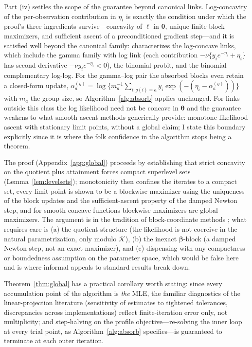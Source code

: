 \documentclass[11pt]{article}
\newcommand{\bbeta}{\bm{\beta}}
\newcommand{\btheta}{\bm{\theta}}
\begin{document}
Part (iv) settles the scope of the guarantee beyond canonical links.
Log-concavity of the per-observation contribution in $\eta_i$ is exactly
the condition under which the proof's three ingredients
survive---concavity of $\ell$ in $\btheta$, unique finite block
maximizers, and sufficient ascent of a preconditioned gradient
step---and it is satisfied well beyond the canonical family:
\citet{pratt1981} characterizes the log-concave links, which include
the gamma family with log link (each contribution
$-\nu\{y_i e^{-\eta_i} + \eta_i\}$ has second derivative
$-\nu y_i e^{-\eta_i} < 0$), the binomial probit, and the binomial
complementary log-log.  For the gamma--log pair the absorbed blocks even
retain a closed-form update,
$\alpha^{(g)}_a = \log\{ m_a^{-1} \sum_{i : g(i)=a} y_i
\exp(-(\eta_i - \alpha^{(g)}_a))\}$ with $m_a$ the group size, so
Algorithm~\ref{alg:absorb} applies unchanged.  For links outside this
class the log likelihood need not be concave in $\btheta$ and the
guarantee weakens to what smooth ascent methods generically provide:
monotone likelihood ascent with stationary limit points, without a
global claim; I state this boundary explicitly since it is where the
folk confidence in the algorithm stops being a theorem.

The proof (Appendix~\ref{app:global}) proceeds by establishing that
strict concavity on the quotient plus attainment forces compact
superlevel sets (Lemma~\ref{lem:levelsets}); monotonicity then confines
the iterates to a compact set, every limit point is shown to be a
blockwise maximizer using the uniqueness of the block updates and the
sufficient-ascent property of the damped Newton step, and for smooth
concave functions blockwise maximizers are global maximizers.  The
argument is in the tradition of block-coordinate methods
\citep{bertsekas1999,tseng2001}; what requires care is (a) the quotient
structure (the likelihood is not coercive in the natural parametrization,
only modulo $\mathcal{K}$), (b) the inexact $\bbeta$-block (a damped
Newton step, not an exact maximizer), and (c) dispensing with any
compactness or boundedness assumption on the parameter space, which would
be false here and is where informal appeals to standard results break
down.

Theorem~\ref{thm:global} has a practical corollary worth stating: since
every accumulation point of the algorithm is \emph{the} MLE, the familiar
diagnostics of the linear-projection literature (sensitivity of estimates
to tightened tolerances, discrepancies across implementations) reflect
finite-iteration error only, not multiplicity; and step-halving on the
profile objective---re-solving the inner loop at every trial point, as
Algorithm~\ref{alg:absorb} specifies---is guaranteed to terminate at each
outer iteration.
\end{document}
